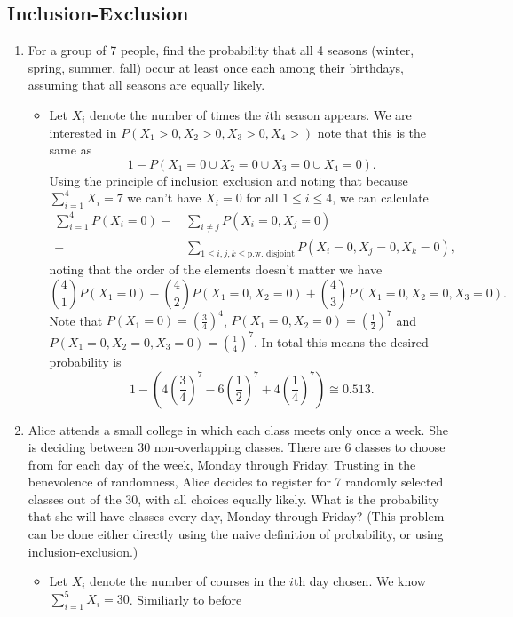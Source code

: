 \documentclass{article}
\begin{document}
\subsection{Inclusion-Exclusion}
\begin{enumerate}
	\item For a group of 7 people, find the probability that all 4 seasons (winter, spring, summer, fall) occur at least once each among their birthdays, assuming that all seasons are equally likely.
		\begin{itemize}
			\item Let $X_i$ denote the number of times the $i$th season appears. We are interested in $P(X_1 > 0, X_2 > 0, X_3 > 0, X_4 > )$ note that this is the same as
			$$
			1 - P(X_1 = 0 \cup X_2 = 0 \cup X_3 = 0 \cup X_4 = 0).
			$$
			Using the principle of inclusion exclusion and noting that because $\sum_{i = 1}^4 X_i = 7$ we can't have $X_i = 0$ for all $1 \leq i \leq 4$, we can calculate
			$$
			\begin{aligned}
			\sum_{i = 1}^4 P(X_i = 0) -&\ \sum_{i \neq j} P(X_i = 0, X_j = 0) \\
			+&\ \sum_{1 \leq i, j, k \leq \text{p.w. disjoint}} P(X_i = 0, X_j = 0, X_k = 0),
			\end{aligned}
			$$
			noting that the order of the elements doesn't matter we have
			$$
			\binom{4}{1} P(X_1 = 0) - \binom{4}{2} P(X_1 = 0, X_2 = 0) + \binom{4}{3} P(X_1 = 0, X_2 = 0, X_3 = 0).
			$$
			Note that $P(X_1 = 0) = \left(\frac{3}{4}\right)^4$, $P(X_1 = 0, X_2 = 0) = \left( \frac{1}{2} \right)^7$ and $P(X_1 = 0, X_2 = 0, X_3 = 0) = \left( \frac{1}{4} \right)^7$. In total this means the desired probability is
			$$
			1 - \left( 4 \left(\frac{3}{4}\right)^7 - 6 \left( \frac{1}{2} \right)^7 + 4 \left( \frac{1}{4} \right)^7 \right) \cong 0.513.
			$$
		\end{itemize}
	\item Alice attends a small college in which each class meets only once a week. She is deciding between 30 non-overlapping classes. There are 6 classes to choose from for each day of the week, Monday through Friday. Trusting in the benevolence of randomness, Alice decides to register for 7 randomly selected classes out of the 30, with all choices equally likely. What is the probability that she will have classes every day, Monday through Friday? (This problem can be done either directly using the naive definition of probability, or using inclusion-exclusion.)
		\begin{itemize}
			\item Let $X_i$ denote the number of courses in the $i$th day chosen. We know $\sum_{i = 1}^5 X_i = 30$. Similiarly to before

\end{itemize}
\end{enumerate}
\end{document}
